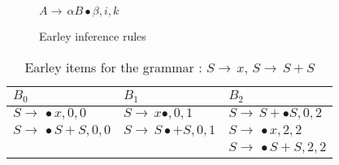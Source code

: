 \begin{isabellebody}
\begin{isamarkuptext}
\begin{figure}[htpb]
\begin{mathpar}
      {$A \rightarrow \, \alpha B \bullet \beta, i, k$}
    \end{mathpar}
    \caption[Earley inference rules]{Earley inference rules}\label{fig:earley-inference-rules}
    \label{fig:inference_rules}
  \end{figure}%
\end{isamarkuptext}\isamarkuptrue%
%
\begin{isamarkuptext}%
\begin{table}[htpb] 
    \caption[Earley items running example]{Earley items for the grammar \isa{{\isasymG}}: $S \rightarrow \, x$, $S \rightarrow \, S + S$}\label{tab:earley-items}
    \centering
    \begin{tabular}{| l | l | l |}
        $B_0$                                   & $B_1$                                    & $B_2$                                \\
      \midrule
        $S \rightarrow \, \bullet x, 0, 0$      & $S \rightarrow \, x \bullet, 0, 1$     & $S \rightarrow \, S + \bullet S, 0, 2$ \\
        $S \rightarrow \, \bullet S + S, 0 , 0$ & $S \rightarrow \, S \bullet + S, 0, 1$ & $S \rightarrow \, \bullet x, 2, 2$     \\
                                                &                                        & $S \rightarrow \, \bullet S + S, 2, 2$ \\

      \midrule


\end{tabular}
\end{table}
\end{isamarkuptext}
\end{isabellebody}
